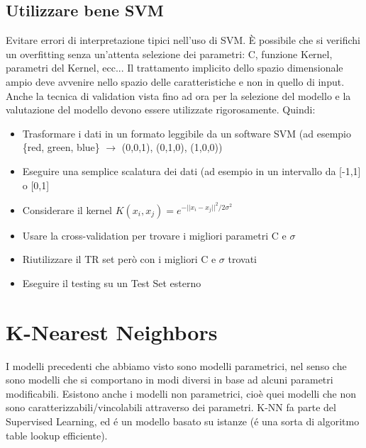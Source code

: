 \documentclass{article}
\begin{document}
\subsection{Utilizzare bene SVM}
Evitare errori di interpretazione tipici nell'uso di SVM. È possibile che si verifichi un overfitting senza un'attenta selezione dei parametri: C, funzione Kernel, parametri del Kernel, ecc... Il trattamento implicito dello spazio dimensionale ampio deve avvenire nello spazio delle caratteristiche e non in quello di input. Anche la tecnica di validation vista fino ad ora per la selezione del modello e la valutazione del modello devono essere utilizzate rigorosamente.
Quindi:
\begin{itemize}
    \item Trasformare i dati in un formato leggibile da un software SVM (ad esempio \{red, green, blue\} $\rightarrow$ (0,0,1), (0,1,0), (1,0,0))
    \item Eseguire una semplice scalatura dei dati (ad esempio in un intervallo da [-1,1] o [0,1]
    \item Considerare il kernel $K(x_i,x_j)=e^{-||x_i-x_j||^2/2\sigma^2}$
    \item Usare la cross-validation per trovare i migliori parametri C e $\sigma$
    \item Riutilizzare il TR set però con i migliori C e $\sigma$ trovati
    \item Eseguire il testing su un Test Set esterno
\end{itemize}
\clearpage

\section{K-Nearest Neighbors}
I modelli precedenti che abbiamo visto sono modelli parametrici, nel senso che sono modelli che si comportano in modi diversi in base ad alcuni parametri modificabili. Esistono anche i modelli non parametrici, cioè quei modelli che non sono caratterizzabili/vincolabili attraverso dei parametri. K-NN fa parte del Supervised Learning, ed é un modello basato su istanze (é una sorta di algoritmo table lookup efficiente).
\end{document}
